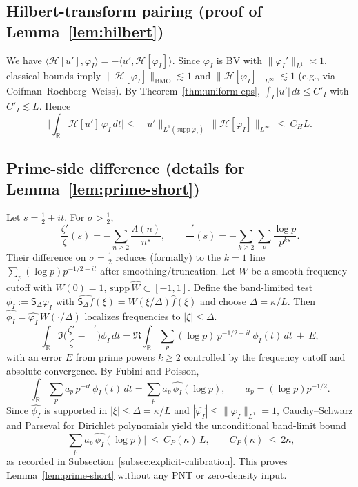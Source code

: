 \documentclass[11pt]{article}
\theoremstyle{definition}
\theoremstyle{remark}
\newcommand{\R}{\mathbb{R}}
\DeclareMathOperator{\dettwo}{det_2}
\begin{document}
\subsection{Hilbert-transform pairing (proof of Lemma~\ref{lem:hilbert})}
We have \(\langle \mathcal H[u'],\varphi_I\rangle=-\langle u',\mathcal H[\varphi_I]\rangle\). Since \(\varphi_I\) is BV with \(\|\varphi_I'\|_{L^1}\asymp 1\), classical bounds imply \(\|\mathcal H[\varphi_I]\|_{\mathrm{BMO}}\lesssim 1\) and \(\|\mathcal H[\varphi_I]\|_{L^\infty}\lesssim 1\) (e.g., via Coifman–Rochberg–Weiss). By Theorem~\ref{thm:uniform-eps}, \(\int_I |u'|\,dt\le C'_I\) with \(C'_I\lesssim L\). Hence
\[\Big|\int_{\R}\mathcal H[u']\,\varphi_I\,dt\Big|\le \|u'\|_{L^1(\mathrm{supp}\,\varphi_I)}\,\|\mathcal H[\varphi_I]\|_{L^\infty}\ \le\ C_H L.\]

\subsection{Prime-side difference (details for Lemma~\ref{lem:prime-short})}
Let \(s=\tfrac12+it\). For \(\sigma>\tfrac12\),
\[\frac{\zeta'}{\zeta}(s)= -\sum_{n\ge 2}\frac{\Lambda(n)}{n^s},\qquad \frac{\dettwo'}{\dettwo}(s)= -\sum_{k\ge 2}\sum_{p}\frac{\log p}{p^{ks}}.\]
Their difference on \(\sigma=\tfrac12\) reduces (formally) to the \(k=1\) line \(\sum_p (\log p) p^{-1/2-it}\) after smoothing/truncation. Let \(W\) be a smooth frequency cutoff with \(W(0)=1\), \(\mathrm{supp}\,\widehat W\subset[-1,1]\). Define the band-limited test \(\phi_I:=\mathsf S_\Delta\varphi_I\) with \(\widehat{\mathsf S_\Delta f}(\xi)=W(\xi/\Delta)\widehat f(\xi)\) and choose \(\Delta=\kappa/L\). Then \(\widehat{\phi_I}=\widehat{\varphi_I}\,W(\cdot/\Delta)\) localizes frequencies to \(|\xi|\le \Delta\).
\[\int_{\R}\Im\Big(\frac{\zeta'}{\zeta}-\frac{\dettwo'}{\dettwo}\Big)\phi_I\,dt=\Re\int_{\R}\sum_{p}(\log p)\,p^{-1/2-it}\,\phi_I(t)\,dt\ +\ E,\]
with an error \(E\) from prime powers \(k\ge 2\) controlled by the frequency cutoff and absolute convergence. By Fubini and Poisson,
\[\int_{\R}\sum_{p}a_p\,p^{-it}\,\phi_I(t)\,dt=\sum_{p}a_p\,\widehat{\phi_I}(\log p),\qquad a_p=(\log p) p^{-1/2}.\]
Since \(\widehat{\phi_I}\) is supported in \(|\xi|\le \Delta=\kappa/L\) and \(|\widehat{\varphi_I}|\le \|\varphi_I\|_{L^1}=1\), Cauchy–Schwarz and Parseval for Dirichlet polynomials yield the unconditional band-limit bound
\[\Big|\sum_{p}a_p\,\widehat{\phi_I}(\log p)\Big|\ \le\ C_P(\kappa)\,L,\qquad C_P(\kappa)\ \le\ 2\kappa,\]
as recorded in Subsection~\ref{subsec:explicit-calibration}. This proves Lemma~\ref{lem:prime-short} without any PNT or zero-density input.
\end{document}
